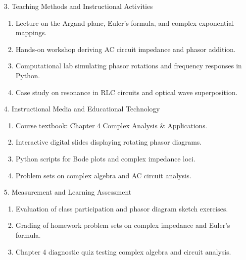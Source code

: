 \newpage

\begin{planbox}[colframe=rbruNavy!85!black, colbacktitle=rbruNavy!85!black]{3. Teaching Methods and Instructional Activities}
\begin{enumerate}[topsep=2pt, itemsep=1pt, partopsep=0pt, parsep=0pt, leftmargin=1.5em]
    \item Lecture on the Argand plane, Euler's formula, and complex exponential mappings.
    \item Hands-on workshop deriving AC circuit impedance and phasor addition.
    \item Computational lab simulating phasor rotations and frequency responses in Python.
    \item Case study on resonance in RLC circuits and optical wave superposition.
\end{enumerate}
\end{planbox}

\begin{planbox}[colframe=rbruGold!90!black, colbacktitle=rbruGold!90!black]{4. Instructional Media and Educational Technology}
\begin{enumerate}[topsep=2pt, itemsep=1pt, partopsep=0pt, parsep=0pt, leftmargin=1.5em]
    \item Course textbook: Chapter 4 Complex Analysis \& Applications.
    \item Interactive digital slides displaying rotating phasor diagrams.
    \item Python scripts for Bode plots and complex impedance loci.
    \item Problem sets on complex algebra and AC circuit analysis.
\end{enumerate}
\end{planbox}

\begin{planbox}[colframe=rbruSlate, colbacktitle=rbruSlate]{5. Measurement and Learning Assessment}
\begin{enumerate}[topsep=2pt, itemsep=1pt, partopsep=0pt, parsep=0pt, leftmargin=1.5em]
    \item Evaluation of class participation and phasor diagram sketch exercises.
    \item Grading of homework problem sets on complex impedance and Euler's formula.
    \item Chapter 4 diagnostic quiz testing complex algebra and circuit analysis.
\end{enumerate}
\end{planbox}
\clearpage

